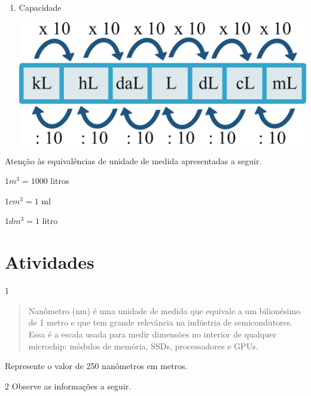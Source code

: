 {\begin{enumerate}
\item Capacidade

\noindent\includegraphics[width=.8\textwidth]{./ilustras-mat/modulo_14-exemplo_b.png}
\end{enumerate}


Atenção às equivalências de unidade de medida apresentadas a seguir.

$1 m^3 = 1000$ litros

$1 cm^3 = 1$ ml

$1 dm^3 = 1$ litro
}

\section*{Atividades}

\num{1} 

\begin{quote}
Nanômetro (nm) é uma unidade de medida que equivale a um bilionésimo
de 1 metro e que tem grande relevância na indústria de semicondutores.
Essa é a escala usada para medir dimensões no interior de qualquer
microchip: módulos de memória, SSDs, processadores e GPUs.

\end{quote}

\pagebreak
Represente o valor de 250 nanômetros em metros.

\begin{emptybox}
\end{emptybox}

\num{2} Observe as informações a seguir.

